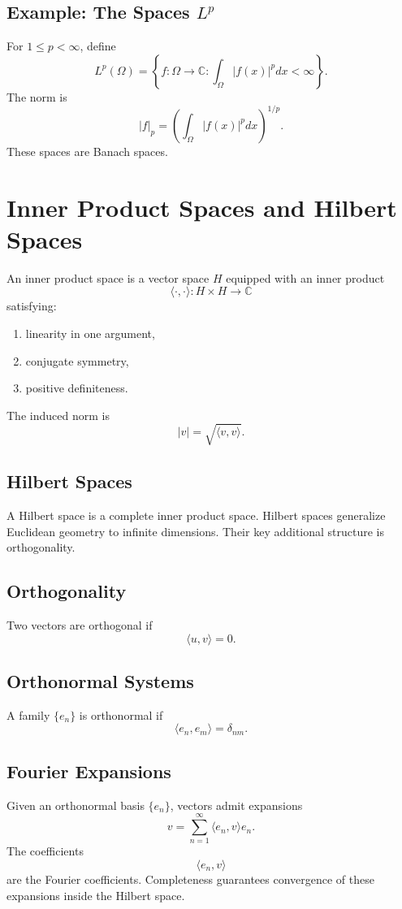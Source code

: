 \documentclass[aps,prl,twocolumn,groupedaddress]{revtex4-2}
\begin{document}
\subsection{Example: The Spaces $L^p$}
For $1 \le p < \infty$, define 
\[
L^p(\Omega) = \left\{f : \Omega \rightarrow \mathbb{C} : \int_\Omega |f(x)|^p dx < \infty\right\}.
\]
The norm is 
\[
|f|_p = \left( \int_\Omega |f(x)|^p dx \right)^{1/p}.
\]
These spaces are Banach spaces.



\section{Inner Product Spaces and Hilbert Spaces}

An inner product space is a vector space $H$ equipped with an inner product 
\[
\langle\cdot,\cdot\rangle : H \times H \rightarrow \mathbb{C} 
\]
satisfying:
\begin{enumerate}
\item linearity in one argument,
\item conjugate symmetry,
\item positive definiteness.
\end{enumerate}
The induced norm is 
\[
|v| = \sqrt{\langle v,v\rangle}.
\]

\subsection{Hilbert Spaces}
A Hilbert space is a complete inner product space. Hilbert spaces generalize Euclidean geometry to infinite dimensions. Their key additional structure is orthogonality.

\subsection{Orthogonality}
Two vectors are orthogonal if 
\[
\langle u,v\rangle = 0.
\]

\subsection{Orthonormal Systems}
A family $\{e_n\}$ is orthonormal if 
\[
\langle e_n, e_m\rangle = \delta_{nm}.
\]

\subsection{Fourier Expansions}
Given an orthonormal basis $\{e_n\}$, vectors admit expansions 
\[
v = \sum_{n=1}^\infty \langle e_n, v\rangle e_n.
\]
The coefficients 
\[
\langle e_n, v\rangle 
\]
are the Fourier coefficients. Completeness guarantees convergence of these expansions inside the Hilbert space.
\end{document}
